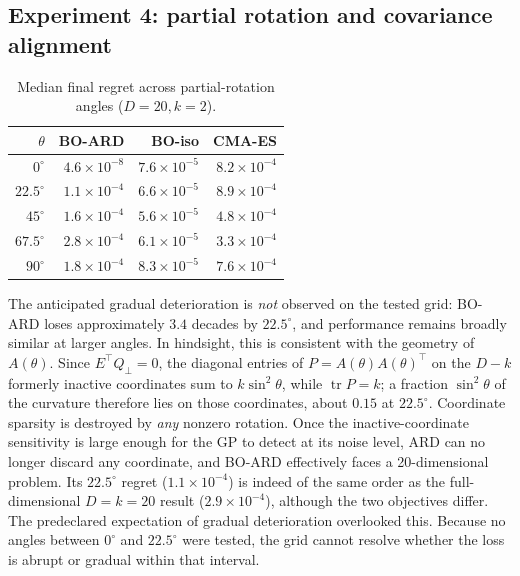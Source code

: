 \documentclass[11pt,a4paper]{article}
\begin{document}
\subsection{Experiment 4: partial rotation and covariance alignment}
\begin{table}[H]\centering\caption{Median final regret across partial-rotation angles ($D=20,k=2$).}\begin{tabular}{rrrr}\toprule $\theta$&BO-ARD&BO-iso&CMA-ES\\\midrule $0^\circ$&$4.6\times10^{-8}$&$7.6\times10^{-5}$&$8.2\times10^{-4}$\\$22.5^\circ$&$1.1\times10^{-4}$&$6.6\times10^{-5}$&$8.9\times10^{-4}$\\$45^\circ$&$1.6\times10^{-4}$&$5.6\times10^{-5}$&$4.8\times10^{-4}$\\$67.5^\circ$&$2.8\times10^{-4}$&$6.1\times10^{-5}$&$3.3\times10^{-4}$\\$90^\circ$&$1.8\times10^{-4}$&$8.3\times10^{-5}$&$7.6\times10^{-4}$\\\bottomrule\end{tabular}\end{table}
The anticipated gradual deterioration is \emph{not} observed on the tested grid: BO-ARD loses approximately $3.4$ decades by $22.5^\circ$, and performance remains broadly similar at larger angles. In hindsight, this is consistent with the geometry of $A(\theta)$. Since $E^\top Q_\perp=0$, the diagonal entries of $P=A(\theta)A(\theta)^\top$ on the $D-k$ formerly inactive coordinates sum to $k\sin^2\theta$, while $\operatorname{tr}P=k$; a fraction $\sin^2\theta$ of the curvature therefore lies on those coordinates, about $0.15$ at $22.5^\circ$. Coordinate sparsity is destroyed by \emph{any} nonzero rotation. Once the inactive-coordinate sensitivity is large enough for the GP to detect at its noise level, ARD can no longer discard any coordinate, and BO-ARD effectively faces a 20-dimensional problem. Its $22.5^\circ$ regret ($1.1\times10^{-4}$) is indeed of the same order as the full-dimensional $D=k=20$ result ($2.9\times10^{-4}$), although the two objectives differ. The predeclared expectation of gradual deterioration overlooked this. Because no angles between $0^\circ$ and $22.5^\circ$ were tested, the grid cannot resolve whether the loss is abrupt or gradual within that interval.
\end{document}
